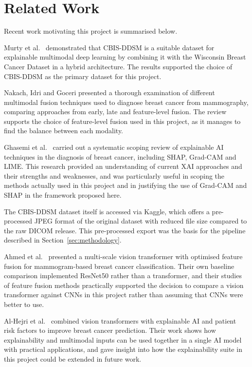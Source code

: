 \section{Related Work}
Recent work motivating this project is summarised below.

Murty et al.\ \citep{murty2024} demonstrated that CBIS-DDSM is a suitable dataset for explainable multimodal deep learning by combining it with the Wisconsin Breast Cancer Dataset in a hybrid architecture. The results supported the choice of CBIS-DDSM as the primary dataset for this project.

Nakach, Idri and Goceri \citep{nakach2024} presented a thorough examination of different multimodal fusion techniques used to diagnose breast cancer from mammography, comparing approaches from early, late and feature-level fusion. The review supports the choice of feature-level fusion used in this project, as it manages to find the balance between each modality.

Ghasemi et al.\ \citep{ghasemi2024} carried out a systematic scoping review of explainable AI techniques in the diagnosis of breast cancer, including SHAP, Grad-CAM and LIME. This research provided an understanding of current XAI approaches and their strengths and weaknesses, and was particularly useful in scoping the methods actually used in this project and in justifying the use of Grad-CAM and SHAP in the framework proposed here.

The CBIS-DDSM dataset itself \citep{cbisddsm} is accessed via Kaggle, which offers a pre-processed JPEG format of the original dataset with reduced file size compared to the raw DICOM release. This pre-processed export was the basis for the pipeline described in Section~\ref{sec:methodology}.

Ahmed et al.\ \citep{ahmed2025} presented a multi-scale vision transformer with optimised feature fusion for mammogram-based breast cancer classification. Their own baseline comparison implemented ResNet50 rather than a transformer, and their studies of feature fusion methods practically supported the decision to compare a vision transformer against CNNs in this project rather than assuming that CNNs were better to use.

Al-Hejri et al.\ \citep{alhejri2025} combined vision transformers with explainable AI and patient risk factors to improve breast cancer prediction. Their work shows how explainability and multimodal inputs can be used together in a single AI model with practical applications, and gave insight into how the explainability suite in this project could be extended in future work.

